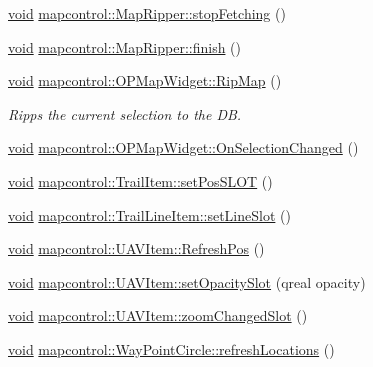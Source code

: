\begin{DoxyCompactItemize}
\item 
\hyperlink{group___u_a_v_objects_plugin_ga444cf2ff3f0ecbe028adce838d373f5c}{void} \hyperlink{group___o_p_map_widget_ga0419a5b1b5c4fef8c6344c8a29320cb7}{mapcontrol\-::\-Map\-Ripper\-::stop\-Fetching} ()
\item 
\hyperlink{group___u_a_v_objects_plugin_ga444cf2ff3f0ecbe028adce838d373f5c}{void} \hyperlink{group___o_p_map_widget_ga137eaecaa016ae12f23b3638657fe797}{mapcontrol\-::\-Map\-Ripper\-::finish} ()
\item 
\hyperlink{group___u_a_v_objects_plugin_ga444cf2ff3f0ecbe028adce838d373f5c}{void} \hyperlink{group___o_p_map_widget_ga3cc1af46a4555caac4d2bcafc775dd3c}{mapcontrol\-::\-O\-P\-Map\-Widget\-::\-Rip\-Map} ()
\begin{DoxyCompactList}\small\item\em Ripps the current selection to the D\-B. \end{DoxyCompactList}\item 
\hyperlink{group___u_a_v_objects_plugin_ga444cf2ff3f0ecbe028adce838d373f5c}{void} \hyperlink{group___o_p_map_widget_gaebc469fcc05092fd93d332b528eae3e5}{mapcontrol\-::\-O\-P\-Map\-Widget\-::\-On\-Selection\-Changed} ()
\item 
\hyperlink{group___u_a_v_objects_plugin_ga444cf2ff3f0ecbe028adce838d373f5c}{void} \hyperlink{group___o_p_map_widget_ga777b7b40dc91ba179a19cc547adeecab}{mapcontrol\-::\-Trail\-Item\-::set\-Pos\-S\-L\-O\-T} ()
\item 
\hyperlink{group___u_a_v_objects_plugin_ga444cf2ff3f0ecbe028adce838d373f5c}{void} \hyperlink{group___o_p_map_widget_gaca380937db6013081d160fdcfed13e2f}{mapcontrol\-::\-Trail\-Line\-Item\-::set\-Line\-Slot} ()
\item 
\hyperlink{group___u_a_v_objects_plugin_ga444cf2ff3f0ecbe028adce838d373f5c}{void} \hyperlink{group___o_p_map_widget_gaf033b133e7911ff98ebc1b6977818fc8}{mapcontrol\-::\-U\-A\-V\-Item\-::\-Refresh\-Pos} ()
\item 
\hyperlink{group___u_a_v_objects_plugin_ga444cf2ff3f0ecbe028adce838d373f5c}{void} \hyperlink{group___o_p_map_widget_ga3b9172d484d3efba36eeae6bddb3f8f2}{mapcontrol\-::\-U\-A\-V\-Item\-::set\-Opacity\-Slot} (qreal opacity)
\item 
\hyperlink{group___u_a_v_objects_plugin_ga444cf2ff3f0ecbe028adce838d373f5c}{void} \hyperlink{group___o_p_map_widget_ga53c572c774d383eb6b672d3ef1da6424}{mapcontrol\-::\-U\-A\-V\-Item\-::zoom\-Changed\-Slot} ()
\item 
\hyperlink{group___u_a_v_objects_plugin_ga444cf2ff3f0ecbe028adce838d373f5c}{void} \hyperlink{group___o_p_map_widget_ga56684f440455598d530b5952c5b0d640}{mapcontrol\-::\-Way\-Point\-Circle\-::refresh\-Locations} ()

\end{DoxyCompactItemize}
